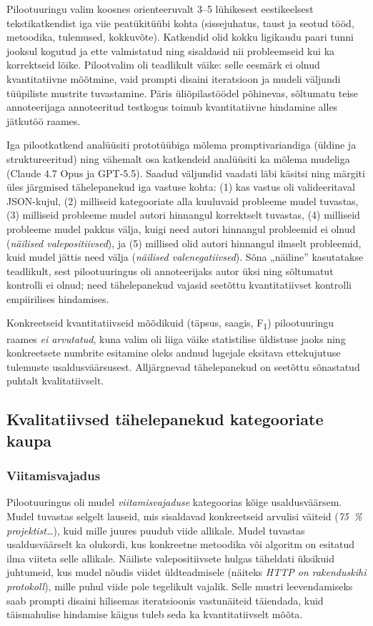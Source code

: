Pilootuuringu valim koosnes orienteeruvalt 3--5 lühikesest eestikeelsest tekstikatkendist iga viie peatükitüübi kohta (sissejuhatus, taust ja seotud tööd, metoodika, tulemused, kokkuvõte). Katkendid olid kokku ligikaudu paari tunni jooksul kogutud ja ette valmistatud ning sisaldasid nii probleemseid kui ka korrektseid lõike. Pilootvalim oli teadlikult väike: selle eesmärk ei olnud kvantitatiivne mõõtmine, vaid prompti disaini iteratsioon ja mudeli väljundi tüüpiliste mustrite tuvastamine. Päris üliõpilastöödel põhinevas, sõltumatu teise annoteerijaga annoteeritud testkogus toimub kvantitatiivne hindamine alles jätkutöö raames.

Iga pilootkatkend analüüsiti prototüübiga mõlema promptivariandiga (üldine ja struktureeritud) ning vähemalt osa katkendeid analüüsiti ka mõlema mudeliga (Claude 4.7 Opus ja GPT-5.5). Saadud väljundid vaadati läbi käsitsi ning märgiti üles järgmised tähelepanekud iga vastuse kohta: (1) kas vastus oli valideeritaval JSON-kujul, (2) milliseid kategooriate alla kuuluvaid probleeme mudel tuvastas, (3) milliseid probleeme mudel autori hinnangul korrektselt tuvastas, (4) milliseid probleeme mudel pakkus välja, kuigi need autori hinnangul probleemid ei olnud (\emph{näilised valepositiivsed}), ja (5) millised olid autori hinnangul ilmselt probleemid, kuid mudel jättis need välja (\emph{näilised valenegatiivsed}). Sõna „näiline” kasutatakse teadlikult, sest pilootuuringus oli annoteerijaks autor üksi ning sõltumatut kontrolli ei olnud; need tähelepanekud vajasid seetõttu kvantitatiivset kontrolli empiirilises hindamises.

Konkreetseid kvantitatiivseid mõõdikuid (täpsus, saagis, F\textsubscript{1}) pilootuuringu raames \emph{ei arvutatud}, kuna valim oli liiga väike statistilise üldistuse jaoks ning konkreetsete numbrite esitamine oleks andnud lugejale eksitava ettekujutuse tulemuste usaldusväärsusest. Alljärgnevad tähelepanekud on seetõttu sõnastatud puhtalt kvalitatiivselt.

\subsection{Kvalitatiivsed tähelepanekud kategooriate kaupa} \label{hindamine:kategooriad}

\subsubsection{Viitamisvajadus}

Pilootuuringus oli mudel \emph{viitamisvajaduse} kategoorias kõige usaldusväärsem. Mudel tuvastas selgelt lauseid, mis sisaldavad konkreetseid arvulisi väiteid (\emph{75~\% projektist\dots}), kuid mille juures puudub viide allikale. Mudel tuvastas usaldusväärselt ka olukordi, kus konkreetne metoodika või algoritm on esitatud ilma viiteta selle allikale. Näiliste valepositiivsete hulgas täheldati üksikuid juhtumeid, kus mudel nõudis viidet üldteadmisele (näiteks \emph{HTTP on rakenduskihi protokoll}), mille puhul viide pole tegelikult vajalik. Selle mustri leevendamiseks saab prompti disaini hilisemas iteratsioonis vastunäiteid täiendada, kuid täismahulise hindamise käigus tuleb seda ka kvantitatiivselt mõõta.

